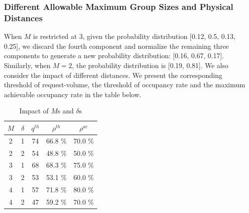 



\subsubsection{Different Allowable Maximum Group Sizes and Physical Distances}
When $M$ is restricted at 3, given the probability distribution [0.12, 0.5, 0.13, 0.25], we discard the fourth component and normalize the remaining three components to generate a new probability distribution: [0.16, 0.67, 0.17]. Similarly, when $M =2$, the probability distribution is [0.19, 0.81].
We also consider the impact of different distances. We present the corresponding threshold of request-volume, the threshold of occupancy rate and the maximum achievable occupancy rate in the table below.

\begin{table}[ht]
  \centering
  \caption{Impact of $M$s and $\delta$s}
  \begin{tabular}{ccccc}
  \hline
   $M$  & $\delta$ & $q^{th}$ & $\rho^{th}$ & $\rho^{ac}$ \\
  \hline
   2 & 1 & 74  & 66.8 \% & 70.0 \% \\
   2 & 2 & 54  & 48.8 \% & 50.0 \% \\ 
   3 & 1 & 68  & 68.3 \% & 75.0 \% \\
   3 & 2 & 53  & 53.1 \% & 60.0 \% \\
   4 & 1 & 57  & 71.8 \% & 80.0 \% \\
   4 & 2 & 47  & 59.2 \% & 70.0 \% \\
   \hline
  \end{tabular}
\end{table}

